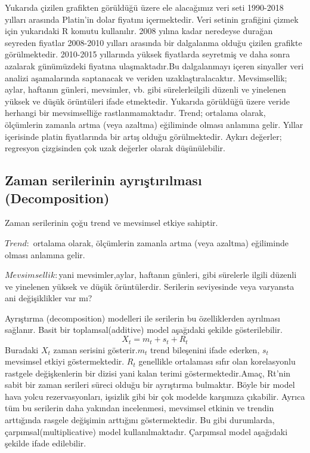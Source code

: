 \documentclass[11pt]{article}
\begin{document}
    Yukarıda çizilen grafikten görüldüğü üzere ele alacağımız veri seti
1990-2018 yılları arasında Platin'in dolar fiyatını içermektedir. Veri
setinin grafiğini çizmek için yukarıdaki R komutu kullanılır. 2008
yılına kadar neredeyse durağan seyreden fiyatlar 2008-2010 yılları
arasında bir dalgalanma olduğu çizilen grafikte görülmektedir. 2010-2015
yıllarında yüksek fiyatlarda seyretmiş ve daha sonra azalarak
günümüzdeki fiyatına ulaşmaktadır.Bu dalgalanmayı içeren sinyaller veri
analizi aşamalarında saptanacak ve veriden uzaklaştıralacaktır.
Mevsimsellik; aylar, haftanın günleri, mevsimler, vb. gibi
sürelerleilgili düzenli ve yinelenen yüksek ve düşük örüntüleri ifade
etmektedir. Yukarıda görüldüğü üzere veride herhangi bir mevsimselliğe
rastlanmamaktadır. Trend; ortalama olarak, ölçümlerin zamanla artma
(veya azaltma) eğiliminde olması anlamına gelir. Yıllar içerisinde
platin fiyatlarında bir artış olduğu görülmektedir. Aykırı değerler;
regresyon çizgisinden çok uzak değerler olarak düşünülebilir.

    \subsection{Zaman serilerinin ayrıştırılması
(Decomposition)}\label{zaman-serilerinin-ayrux131ux15ftux131rux131lmasux131-decomposition}

Zaman serilerinin çoğu trend ve mevsimsel etkiye sahiptir.

\(Trend:\) ortalama olarak, ölçümlerin zamanla artma (veya azaltma)
eğiliminde olması anlamına gelir.

\(Mevsimsellik:\)yani mevsimler,aylar, haftanın günleri, gibi sürelerle
ilgili düzenli ve yinelenen yüksek ve düşük örüntülerdir. Serilerin
seviyesinde veya varyansta ani değişiklikler var mı?

Ayrıştırma (decomposition) modelleri ile serilerin bu özelliklerden
ayrılması sağlanır. Basit bir toplamsal(additive) model aşağıdaki
şekilde gösterilebilir. \[X_t=m_t+s_t+R_t\] Buradaki \(X_t\) zaman
serisini gösterir.\(m_t\) trend bileşenini ifade ederken, \(s_t\)
mevsimsel etkiyi göstermektedir. \(R_t\) genellikle ortalaması sıfır
olan korelasyonlu rastgele değişkenlerin bir dizisi yani kalan terimi
göstermektedir.Amaç, Rt'nin sabit bir zaman serileri süreci olduğu bir
ayrıştırma bulmaktır. Böyle bir model hava yolcu rezervasyonları,
işsizlik gibi bir çok modelde karşımıza çıkabilir. Ayrıca tüm bu
serilerin daha yakından incelenmesi, mevsimsel etkinin ve trendin
arttığında rasgele değişimin arttığını göstermektedir. Bu gibi
durumlarda, çarpımsal(multiplicative) model kullanılmaktadır. Çarpımsal
model aşağıdaki şekilde ifade edilebilir.
\end{document}

